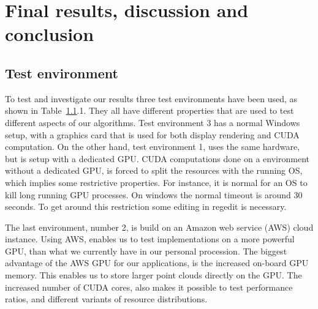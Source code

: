 
\chapter{Final results, discussion and conclusion} %
\label{sec:final_results_discussion_and_conclusion}

\section{Test environment} %
\label{sec:test_environment}

To test and investigate our results three test environments have been used, as shown in Table~\ref{sec:test_environment}.1. They all have different properties that are used to test different aspects of our algorithms. Test environment 3 has a normal Windows setup, with a graphics card that is used for both display rendering and CUDA computation. On the other hand, test environment 1, uses the same hardware, but is setup with a dedicated GPU\@. CUDA computations done on a environment without a dedicated GPU, is forced to split the resources with the running OS, which implies some restrictive properties. For instance, it is normal for an OS to kill long running GPU processes. On windows the normal timeout is around $30$ seconds. To get around this restriction some editing in regedit is necessary.

The last environment, number 2, is build on an Amazon web service (AWS) cloud instance. Using AWS, enables us to test implementations on a more powerful GPU, than what we currently have in our personal procession. The biggest advantage of the AWS GPU for our applications, is the increased on-board GPU memory. This enables us to store larger point clouds directly on the GPU. The increased number of CUDA cores, also makes it possible to test performance ratios, and different variants of resource distributions.

